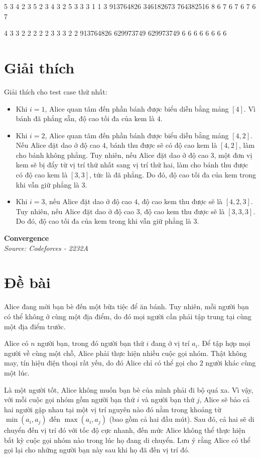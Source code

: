 \documentclass[11pt]{article}
\newcommand{\problem}[2]{
    \begin{problembox}
    \begin{center}
        \Large \textbf{#1} \\
        \vspace{0.2cm}
        \small \textit{Source: #2}
    \end{center}
    \end{problembox}
}
\newcommand{\exmp}[2]{
    \begin{inputbox}#1\end{inputbox}
    \begin{outputbox}#2\end{outputbox}
}
\begin{document}
\exmp{5
3
4 2 3
5
2 3 4 3 2
5
3 3 3 1 1
3
913764826 346182673 764382516
8
6 7 6 7 6 7 6 7
}{4 3 3 
2 2 2 2 2 
3 3 3 2 2 
913764826 629973749 629973749 
6 6 6 6 6 6 6 6 
}%


\section*{Giải thích}
Giải thích cho test case thứ nhất:
\begin{itemize}
    \item Khi $i = 1$, Alice quan tâm đến phần bánh được biểu diễn bằng mảng $[4]$. Vì bánh đã phẳng sẵn, độ cao tối đa của kem là $4$.
    \item Khi $i = 2$, Alice quan tâm đến phần bánh được biểu diễn bằng mảng $[4, 2]$. Nếu Alice đặt dao ở độ cao $4$, bánh thu được sẽ có độ cao kem là $[4, 2]$, làm cho bánh không phẳng. Tuy nhiên, nếu Alice đặt dao ở độ cao $3$, một đơn vị kem sẽ bị đẩy từ vị trí thứ nhất sang vị trí thứ hai, làm cho bánh thu được có độ cao kem là $[3, 3]$, tức là đã phẳng. Do đó, độ cao tối đa của kem trong khi vẫn giữ phẳng là $3$.
    \item Khi $i = 3$, nếu Alice đặt dao ở độ cao $4$, độ cao kem thu được sẽ là $[4, 2, 3]$. Tuy nhiên, nếu Alice đặt dao ở độ cao $3$, độ cao kem thu được sẽ là $[3, 3, 3]$. Do đó, độ cao tối đa của kem trong khi vẫn giữ phẳng là $3$.
\end{itemize}

\newpage
\problem{Convergence}{Codeforces - 2232A}

\section*{Đề bài}
Alice đang mời bạn bè đến một bữa tiệc để ăn bánh. Tuy nhiên, mỗi người bạn có thể không ở cùng một địa điểm, do đó mọi người cần phải tập trung tại cùng một địa điểm trước.

Alice có $n$ người bạn, trong đó người bạn thứ $i$ đang ở vị trí $a_i$. Để tập hợp mọi người về cùng một chỗ, Alice phải thực hiện nhiều cuộc gọi nhóm. Thật không may, tín hiệu điện thoại rất yếu, do đó Alice chỉ có thể gọi cho $2$ người khác cùng một lúc.

Là một người tốt, Alice không muốn bạn bè của mình phải đi bộ quá xa. Vì vậy, với mỗi cuộc gọi nhóm gồm người bạn thứ $i$ và người bạn thứ $j$, Alice sẽ bảo cả hai người gặp nhau tại một vị trí nguyên nào đó nằm trong khoảng từ $\min(a_i, a_j)$ đến $\max(a_i, a_j)$ (bao gồm cả hai đầu mút). Sau đó, cả hai sẽ di chuyển đến vị trí đó với tốc độ cực nhanh, đến mức Alice không thể thực hiện bất kỳ cuộc gọi nhóm nào trong lúc họ đang di chuyển. Lưu ý rằng Alice có thể gọi lại cho những người bạn này sau khi họ đã đến vị trí đó.
\end{document}
